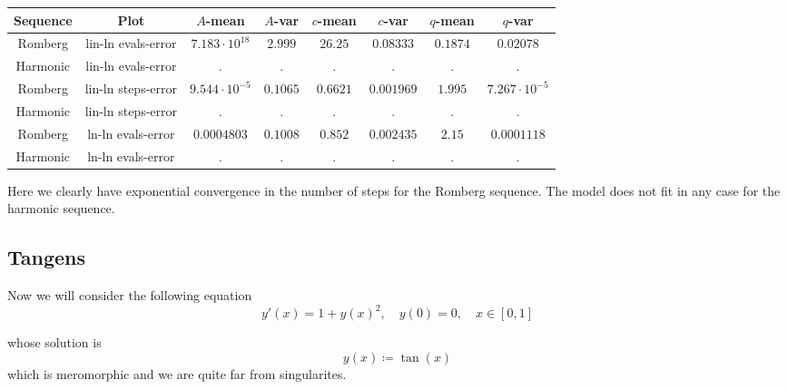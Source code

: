 \begin{table}[H]
    \centering
    \small
     \begin{tabular}{c|c||c|c|c|c|c|c}
Sequence & Plot & \(A\)-mean & \(A\)-var & \(c\)-mean & \(c\)-var & \(q\)-mean & \(q\)-var\\\hline
Romberg & lin-ln evals-error & \(7.183\cdot 10^{18}\) & \(2.999\) & \(26.25\) & \(0.08333\) & \(0.1874\) & \(0.02078\) \\
Harmonic & lin-ln evals-error & . & . & . & . & . & . \\
Romberg & lin-ln steps-error & \(9.544\cdot 10^{-5}\) & \(0.1065\) & \(0.6621\) & \(0.001969\) & \(1.995\) & \(7.267\cdot 10^{-5}\) \\
Harmonic & lin-ln steps-error & . & . & . & . & . & . \\
Romberg & ln-ln evals-error & \(0.0004803\) & \(0.1008\) & \(0.852\) & \(0.002435\) & \(2.15\) & \(0.0001118\) \\
Harmonic & ln-ln evals-error & . & . & . & . & . & . \\
    \end{tabular}
    \label{tab:my_label}
\end{table}

Here we clearly have exponential convergence in the number of steps for the Romberg sequence. The model does not fit in any case for the harmonic sequence.

\subsection{Tangens}

Now we will consider the following equation
\begin{equation}
y'(x) = 1 + y(x)^2, \quad y(0) = 0,\quad x\in [0,1]
\end{equation}

whose solution is 
\[
y(x) \coloneqq \tan(x)
\]
which is meromorphic and we are quite far from singularites.

